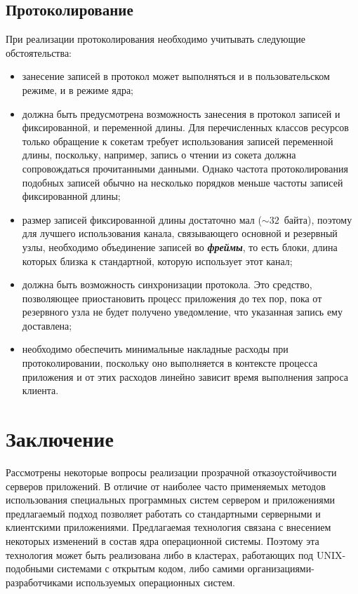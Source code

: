 \begin{multicols}{2}
\subsection*{Протоколирование}

При реализации протоколирования необходимо учитывать следующие
обстоятельства:
\begin{itemize}
\item занесение записей в протокол может выполняться и в пользовательском режиме, и в
режиме ядра;
\item должна быть предусмотрена возможность занесения в протокол записей и
фиксированной, и переменной длины. Для пере\-чис\-лен\-ных классов ресурсов только
обращение к сокетам требует использования записей переменной длины, поскольку,
например, запись о чтении из сокета должна сопровождаться прочитанными данными.
Однако частота протоколирования подобных записей обычно на несколько порядков меньше
частоты записей фиксированной длины;
\item размер записей фиксированной длины достаточно мал ($\sim 32$~байта), поэтому
для лучшего использования канала, свя\-зы\-ва\-юще\-го основной и резервный узлы, необходимо
объединение записей во {\bfseries\textit{фреймы}}, то есть блоки, длина которых близка к стандартной,
которую использует этот канал;
\item должна быть возможность синхронизации протокола. Это средство, позволяющее
приостановить процесс приложения до тех пор, пока от резервного узла не будет получено
уведомление, что указанная запись ему доставлена;
\item необходимо обеспечить минимальные накладные расходы при
протоколировании, поскольку оно выполняется в контексте процесса
приложения и от этих расходов линейно зависит время выполнения запроса
клиента.
\end{itemize}

\section{Заключение}

Рассмотрены некоторые вопросы реализации прозрачной
отказоустойчивости серверов при\-ло\-же\-ний. В отличие от наиболее час\-то
при\-ме\-ня\-емых методов использования специальных програм\-мных систем
сервером и приложениями предлагаемый подход позволяет работать со
стандартными серверными и
 клиентскими приложениями. Пред\-лага\-емая
тех\-нология  связана с внесением некоторых изменений в состав ядра
операционной системы. Поэтому эта технология может быть реализована либо
в кластерах, работающих под UNIX-подобными системами с открытым кодом,
либо самими организациями-разработчиками используемых операционных
систем.


\end{multicols}
